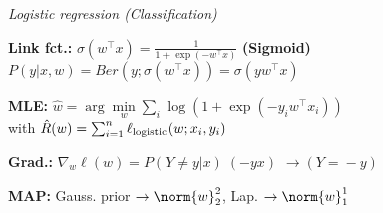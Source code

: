 \emph{Logistic regression (Classification)}

\textbf{Link fct.:} $\sigma(w^\top x) = \frac{1}{1+\exp(-w^\top x)}$ \enskip \textbf{(Sigmoid)}\\
$P(y\vert x,w) = Ber (y; \sigma(w^\top\!x)) = \sigma(yw^\top x)$

\textbf{MLE:}
$\hat w = \arg\!\min\limits_w \sum_i \log(1+\exp(-y_iw^\top\!x_i))$\vspace{-3pt}\\
 with $\hat R(w) = \sum_{i=1}^n \ell_\mathrm{logistic} (w; x_i, y_i)$

\textbf{Grad.:} $\nabla\!_w \ell(w) = P(Y\!\!\neq\!y \vert x) \; (-yx)$
\hfill {\color{gray}\small $\to (Y\!\!=\!-\!y)$}

\textbf{MAP:} Gauss. prior $\to \norm{w}_2^2$, \enskip Lap. $\to \norm{w}_1^1$
